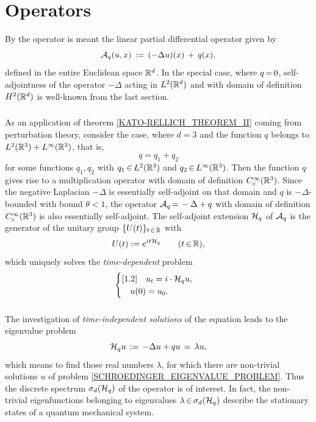 \documentclass[11pt,twoside]{article}
\begin{document}
\section{{\SCHROEDINGER} Operators}
By the {\SCHROEDINGER} operator is meant
the linear partial differential operator given by
\[
{\mathcal{A}}_q(u,x) \,:=\, (-\Delta u)(x)\, + \, q(x),
\]
defined in the entire Euclidean space ${\mathbb{R}}^d$.
In the special case,
where $q {\,=\,} 0$,
self-adjointness of the operator $-\Delta$ acting in $L^2({\mathbb{R}}^d)$
and with domain of definition $H^2({\mathbb{R}}^d)$ is well-known from the last section.

\subparagraph*{}
As an application of theorem \ref{KATO-RELLICH_THEOREM_II}
coming from perturbation theory,
consider the case,
where $d=3$ and the function $q$ belongs to $L^2({\mathbb{R}}^3) + L^{\infty}({\mathbb{R}}^3)$,
that is,
\[
q = q_1 + q_2
\]
for some functions $q_1, q_2$
with $q_1 {\,\in\,} L^2({\mathbb{R}}^3)$ and $q_2 {\,\in\,} L^{\infty}({\mathbb{R}}^3)$.
Then the function $q$ gives rise to a multiplication operator 
with domain of definition $C_c^{\infty}({\mathbb{R}}^3)$.
Since the negative Laplacian $-\Delta$ is essentially self-adjoint 
on that domain
and $q$ is $-\Delta$-bounded with bound $\theta < 1$,
the operator ${\mathcal{A}}_q {\,=\,} -\Delta+q$
with domain of definition $C_c^{\infty}({\mathbb{R}}^3)$ is also essentially self-adjoint.
The self-adjoint extension ${\mathcal{H}}_q$ of ${\mathcal{A}}_q$ 
is the generator of the unitary group $\{U(t)\}_{t {\,\in\,} {\mathbb{R}}}$ with 
\[
U(t) := e^{it {\mathcal{H}}_q} \quad \quad (t {\,\in\,} {\mathbb{R}}),
\]
which uniquely solves the \textit{time-dependent} {\SCHROEDINGER} problem
\[
\begin{cases}[1.2]
\quad u_t = i \cdot {\mathcal{H}}_q u,\\
\quad u(0) = u_0.\\
\end{cases}
\]

\subsubsection*{} %
The investigation of \textit{time-independent solutions}
of the {\SCHROEDINGER} equation leads to the eigenvalue problem
\begin{equation}\label{SCHROEDINGER_EIGENVALUE_PROBLEM}
{\mathcal{H}}_q u \,:=\, -\Delta u + qu \,=\, \lambda u,
\end{equation}
which means to find those real numbers $\lambda$,
for which there are non-trivial solutions $u$
of problem \eqref{SCHROEDINGER_EIGENVALUE_PROBLEM}.
Thus the discrete spectrum $\sigma_d({\mathcal{H}}_q)$ of the {\SCHROEDINGER} operator
is of interest.
In fact,
the non-trivial eigenfunctions belonging to eigenvalues
$\lambda {\,\in\,} \sigma_d({\mathcal{H}}_q)$ describe
the stationary states of a quantum mechanical system.
\end{document}
